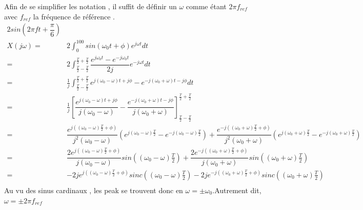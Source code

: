 \documentclass[11pt,a4paper]{article}
\begin{document}
Afin de se simplifier les notation , il suffit de définir un $\omega$ comme étant $2\pi f_{ref}$ avec $f_{ref}$ la fréquence de référence .  \\

\begin{align*}
	2sin(2\pi f t + \dfrac{\pi}{6}) &                                                                                                                                                                                              \\
	X(j\omega)=                     & 2 \int_{0}^{100} sin(\omega _{0}t + \phi)e^{j\omega t} dt                                                                                                                                    \\
	=                               & 2 \int_{\frac T2 - \frac T2} ^{\frac T2 + \frac T2} \dfrac{e^{j \omega _0 t}-e^{-j \omega _0 t}}{2j} e^{-j\omega t} dt                                                                       \\
	=                               & \frac 1j \int_{\frac T2 - \frac T2} ^{\frac T2 + \frac T2} e^{j (\omega _0 - \omega)t+j\phi }- e^{-j( \omega _0+ \omega)t-j\phi} dt                                                          \\
	=                               & \frac 1j \left [ \dfrac{e^{j(\omega_0-\omega)t+j\phi}}{j(\omega_0-\omega)}- \dfrac{e^{-j(\omega_0+\omega)t-j\phi}}{j(\omega_0+\omega)} \right] _{\frac T2 - \frac T2} ^{\frac T2 + \frac T2} \\
	=                               & \dfrac{e^{j\left((\omega _0-\omega)\frac T2 + \phi \right)}}{j^2(\omega _0 - \omega)} \left(e^{j(\omega _0- \omega)\frac T2 } -e^{-j(\omega _0- \omega)\frac T2 } \right)
	+ \dfrac{e^{-j\left((\omega_0+\omega)\frac T2+ \phi\right)}}{j^2(\omega _0 + \omega)}\left( e^{j(\omega_0 + \omega)\frac T2 } - e^{-j(\omega_0+\omega)\frac T2}\right)                                                         \\
	=                               & \dfrac{2e^{j\left((\omega _0-\omega)\frac T2 + \phi \right)}}{j(\omega _0 - \omega)} sin\left((\omega_0-\omega)\frac T2 \right)
	+ \dfrac{2e^{-j\left((\omega_0+\omega)\frac T2+ \phi\right)}}{j(\omega _0 + \omega)}sin\left((\omega_0+\omega)\frac T2\right)                                                                                                  \\
	=                               & -2je^{j\left((\omega _0-\omega)\frac T2 + \phi \right)}sinc\left((\omega_0-\omega)\frac T2 \right)
	- 2je^{-j\left((\omega_0+\omega)\frac T2+ \phi\right)}sinc\left((\omega_0+\omega)\frac T2\right)                                                                                                                               \\
\end{align*}
Au vu des sinus cardinaux , les peak se trouvent donc en $\omega =\pm\omega_0$.Autrement dit, $\omega=\pm 2 \pi f_{ref}$
\end{document}
